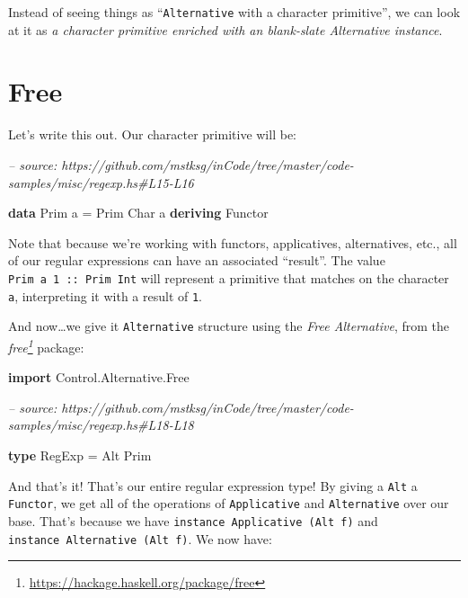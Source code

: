 \documentclass[]{article}
\newenvironment{Shaded}{}{}
\newcommand{\CommentTok}[1]{\textcolor[rgb]{0.38,0.63,0.69}{\textit{#1}}}
\newcommand{\DataTypeTok}[1]{\textcolor[rgb]{0.56,0.13,0.00}{#1}}
\newcommand{\FunctionTok}[1]{\textcolor[rgb]{0.02,0.16,0.49}{#1}}
\newcommand{\KeywordTok}[1]{\textcolor[rgb]{0.00,0.44,0.13}{\textbf{#1}}}
\newcommand{\NormalTok}[1]{#1}
\renewcommand{\href}[2]{#2\footnote{\url{#1}}}
\begin{document}
Instead of seeing things as ``\texttt{Alternative} with a character primitive'',
we can look at it as \emph{a character primitive enriched with an blank-slate
Alternative instance}.

\hypertarget{free}{%
\section{Free}\label{free}}

Let's write this out. Our character primitive will be:

\begin{Shaded}
\begin{Highlighting}[]
\CommentTok{-- source: https://github.com/mstksg/inCode/tree/master/code-samples/misc/regexp.hs#L15-L16}

\KeywordTok{data} \DataTypeTok{Prim}\NormalTok{ a }\FunctionTok{=} \DataTypeTok{Prim} \DataTypeTok{Char}\NormalTok{ a}
  \KeywordTok{deriving} \DataTypeTok{Functor}
\end{Highlighting}
\end{Shaded}

Note that because we're working with functors, applicatives, alternatives, etc.,
all of our regular expressions can have an associated ``result''. The value
\texttt{Prim\ \textquotesingle{}a\textquotesingle{}\ 1\ ::\ Prim\ Int} will
represent a primitive that matches on the character \texttt{a}, interpreting it
with a result of \texttt{1}.

And now\ldots{}we give it \texttt{Alternative} structure using the \emph{Free
Alternative}, from the
\emph{\href{https://hackage.haskell.org/package/free}{free}} package:

\begin{Shaded}
\begin{Highlighting}[]
\KeywordTok{import} \DataTypeTok{Control.Alternative.Free}

\CommentTok{-- source: https://github.com/mstksg/inCode/tree/master/code-samples/misc/regexp.hs#L18-L18}

\KeywordTok{type} \DataTypeTok{RegExp} \FunctionTok{=} \DataTypeTok{Alt} \DataTypeTok{Prim}
\end{Highlighting}
\end{Shaded}

And that's it! That's our entire regular expression type! By giving a
\texttt{Alt} a \texttt{Functor}, we get all of the operations of
\texttt{Applicative} and \texttt{Alternative} over our base. That's because we
have \texttt{instance\ Applicative\ (Alt\ f)} and
\texttt{instance\ Alternative\ (Alt\ f)}. We now have:
\end{document}
